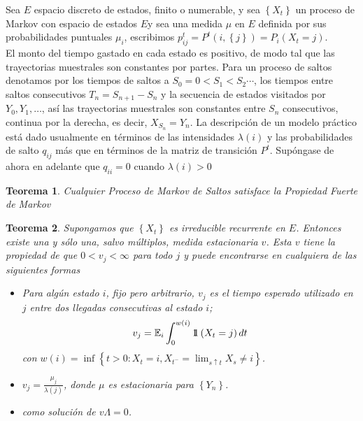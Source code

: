 \documentclass{article}
\newtheorem{Teo}{Teorema}[section]
\newcommand{\esp}{\mathbb{E}}
\newcommand{\indora}{\mbox{$1$\hspace{-0.8ex}$1$}}
\numberwithin{equation}{section}
\begin{document}

Sea $E$ espacio discreto de estados, finito o numerable, y sea $\left\{X_{t}\right\}$ un proceso de Markov con espacio de estados $E$y sea una medida $\mu$ en $E$ definida por sus probabilidades puntuales $\mu_{i}$, escribimos $p_{ij}^{t}=P^{t}\left(i,\left\{j\right\}\right)=P_{i}\left(X_{t}=j\right)$.\\

El monto del tiempo gastado en cada estado es positivo, de modo tal que las trayectorias muestrales son constantes por partes. Para un proceso de saltos denotamos por los tiempos de saltos a $S_{0}=0<S_{1}<S_{2}\cdots$, los tiempos entre saltos consecutivos $T_{n}=S_{n+1}-S_{n}$ y la secuencia de estados visitados por $Y_{0},Y_{1},\ldots$, as\'i las trayectorias muestrales son constantes entre $S_{n}$ consecutivos, continua por la derecha, es decir, $X_{S_{n}}=Y_{n}$.  La descripci\'on de un modelo pr\'actico est\'a dado usualmente en t\'erminos de las intensidades $\lambda\left(i\right)$ y las probabilidades de salto $q_{ij}$ m\'as que en t\'erminos de la matriz de transici\'on $P^{t}$. Sup\'ongase de ahora en adelante que $q_{ii}=0$ cuando $\lambda\left(i\right)>0$

\begin{Teo}
Cualquier Proceso de Markov de Saltos satisface la Propiedad Fuerte de Markov
\end{Teo}

\begin{Teo}\label{Teo.4.2}
Supongamos que $\left\{X_{t}\right\}$ es irreducible recurrente en $E$. Entonces existe una y s\'olo una, salvo m\'ultiplos, medida estacionaria $v$. Esta $v$ tiene la propiedad de que $0<v_{j}<\infty$ para todo $j$ y puede encontrarse en cualquiera de las siguientes formas

\begin{itemize}
\item[i)] Para alg\'un estado $i$, fijo pero arbitrario, $v_{j}$ es el tiempo esperado utilizado en $j$ entre dos llegadas consecutivas al estado $i$;
\begin{equation}\label{Eq.4.2}
v_{j}=\esp_{i}\int_{0}^{w\left(i\right)}\indora\left(X_{t}=j\right)dt
\end{equation}
con $w\left(i\right)=\inf\left\{t>0:X_{t}=i,X_{t^{-}}=\lim_{s\uparrow t}X_{s}\neq i\right\}$. 
\item[ii)]
$v_{j}=\frac{\mu_{j}}{\lambda\left(j\right)}$, donde $\mu$ es estacionaria para $\left\{Y_{n}\right\}$. \item[iii)] como
soluci\'on de $v\Lambda=0$.
\end{itemize}
\end{Teo}
\end{document}
